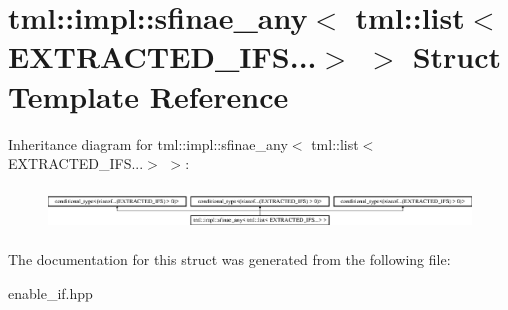 \hypertarget{structtml_1_1impl_1_1sfinae__any_3_01tml_1_1list_3_01EXTRACTED__IFS_8_8_8_4_01_4}{\section{tml\+:\+:impl\+:\+:sfinae\+\_\+any$<$ tml\+:\+:list$<$ E\+X\+T\+R\+A\+C\+T\+E\+D\+\_\+\+I\+F\+S...$>$ $>$ Struct Template Reference}
\label{structtml_1_1impl_1_1sfinae__any_3_01tml_1_1list_3_01EXTRACTED__IFS_8_8_8_4_01_4}
}
Inheritance diagram for tml\+:\+:impl\+:\+:sfinae\+\_\+any$<$ tml\+:\+:list$<$ E\+X\+T\+R\+A\+C\+T\+E\+D\+\_\+\+I\+F\+S...$>$ $>$\+:\begin{figure}[H]
\begin{center}
\leavevmode
\includegraphics[height=1.159420cm]{structtml_1_1impl_1_1sfinae__any_3_01tml_1_1list_3_01EXTRACTED__IFS_8_8_8_4_01_4}
\end{center}
\end{figure}


The documentation for this struct was generated from the following file\+:\begin{DoxyCompactItemize}
\item 
enable\+\_\+if.\+hpp\end{DoxyCompactItemize}
